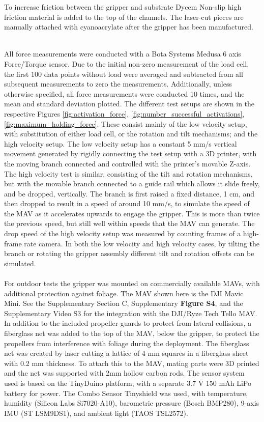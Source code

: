 To increase friction between the gripper and substrate Dycem Non-slip high friction material is added to the top of the channels. The laser-cut pieces are manually attached with cyanoacrylate after the gripper has been manufactured. 


\\
All force measurements were conducted with a Bota Systems Medusa 6 axis Force/Torque sensor. 
Due to the initial non-zero measurement of the load cell, the first 100 data points without load were averaged and subtracted from all subsequent measurements to zero the measurements. Additionally, unless otherwise specified, all force measurements were conducted 10 times, and the mean and standard deviation plotted. The different test setups are shown in the respective Figures \ref{fig:activation_force}, \ref{fig:number_successful_activations}, \ref{fig:maximum_holding_force}. These consist mainly of the low velocity setup, with substitution of either load cell, or the rotation and tilt mechanisms; and the high velocity setup. The low velocity setup has a constant 5 mm/s vertical movement generated by rigidly connecting the test setup with a 3D printer, with the moving branch connected and controlled with the printer's movable Z-axis. The high velocity test is similar, consisting of the tilt and rotation mechanisms, but with the movable branch connected to a guide rail which allows it slide freely, and be dropped, vertically. The branch is first raised a fixed distance, 1 cm, and then dropped to result in a speed of around 10 mm/s, to simulate the speed of the MAV as it accelerates upwards to engage the gripper. This is more than twice the previous speed, but still well within speeds that the MAV can generate. The drop speed of the high velocity setup was measured by counting frames of a high-frame rate camera. In both the low velocity and high velocity cases, by tilting the branch or rotating the gripper assembly different tilt and rotation offsets can be simulated.\\
\\
For outdoor tests the gripper was mounted on commercially available MAVs, with additional protection against foliage. The MAV shown here is the DJI Mavic Mini. See the Supplementary Section C, Supplementary \textbf{Figure S4}, and the Supplementary Video S3 for the integration with the DJI/Ryze Tech Tello MAV. In addition to the included propeller guards to protect from lateral collisions, a fiberglass net was added to the top of the MAV, below the gripper, to protect the propellers from interference with foliage during the deployment. The fiberglass net was created by laser cutting a lattice of 4 mm squares in a fiberglass sheet with 0.2 mm thickness. To attach this to the MAV, mating parts were 3D printed and the net was supported with 2mm hollow carbon rods. The sensor system used is based on the TinyDuino platform, with a separate 3.7 V 150 mAh LiPo battery for power. The Combo Sensor Tinyshield was used, with temperature, humidity (Silicon Labs Si7020-A10), barometric pressure (Bosch BMP280), 9-axis IMU (ST LSM9DS1), and ambient light (TAOS TSL2572).
